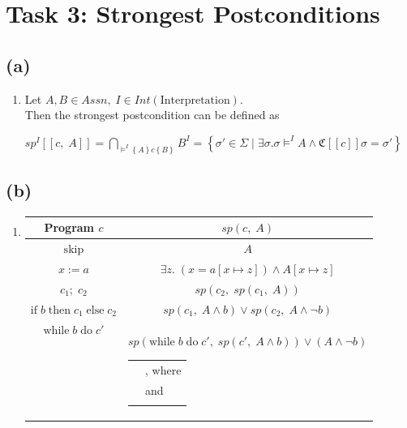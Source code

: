 \documentclass[12pt]{scrartcl}
\newcommand{\lbr}{[\![}
\newcommand{\rbr}{]\!]}
\begin{document}
	\section*{Task 3: Strongest Postconditions}
	
	\subsection*{(a)}
	
	\begin{enumerate}
		\item[] Let $A,B\in Assn,\;I\in Int(\text{Interpretation})$.\\
		Then the strongest postcondition can be defined as\\
		\begin{center}
			$ sp^{I}\lbr c,\;A\rbr=\bigcap\limits_{\models^{I}\left\{A\right\}c\left\{B\right\}} B^{I}=\left\{\sigma'\in\Sigma\; |\; \exists\sigma .\sigma\models^{I}A\wedge\mathfrak{C}\lbr c\rbr\sigma=\sigma'\right\}$
		\end{center}
	\end{enumerate}		
	
	\subsection*{(b)}
	
	\begin{enumerate}
	\item[] \begin{tabular}{c|c}
	Program $c$ & $sp\left(c,\;A\right)$\\\hline
	$\text{skip}$ & $A$\\
	$x:=a$ & $\exists z.\;\left(x=a\left[x\mapsto z\right]\right)\wedge A\left[x\mapsto z\right]$\\
	$c_{1};\;c_{2}$ & $sp\left(c_{2},\;sp\left(c_{1},\;A\right)\right)$\\
	$\text{if}\;b\;\text{then}\;c_{1}\;\text{else}\;c_{2}$ & $sp\left(c_{1},\; A\wedge b\right)\vee sp\left(c_{2},\;A\wedge\neg b\right)$\\
	$\text{while}\;b\;\text{do}\;c'$ & \parbox[t]{10cm}{$sp\left(\text{while}\;b\;\text{do}\;c',\;sp\left(c',\;A\wedge b\right)\right)\vee\left(A\wedge\neg b\right)$\\
	\begin{tabular}{rl}
	$\equiv$ & $\bigwedge\limits_{i\in \mathbb{N}}F_{i}$, where\\
			 & $F_{i+1}=\left(\neg b\rightarrow A\right)\wedge \left( b\rightarrow sp\left(c,\;F_{i}\right)\right)$ and\\
			 & $F_{0}=\text{true}$\\
	\end{tabular}}\\
	\end{tabular}
	\end{enumerate}
	
\end{document}
